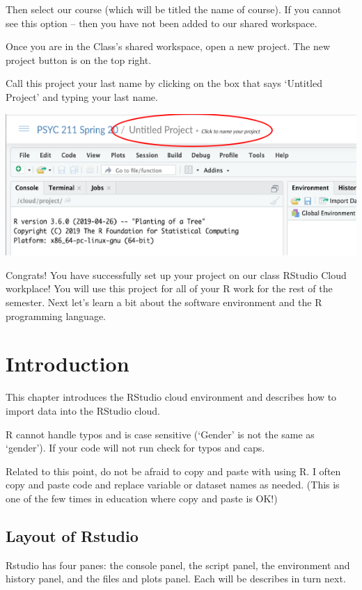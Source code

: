 \documentclass[
]{book}
\begin{document}
Then select our course (which will be titled the name of course). If you cannot see this option -- then you have not been added to our shared workspace.

Once you are in the Class's shared workspace, open a new project. The new project button is on the top right.

Call this project your last name by clicking on the box that says `Untitled Project' and typing your last name.

\includegraphics{img/Projname.png}

Congrats! You have successfully set up your project on our class RStudio Cloud workplace! You will use this project for all of your R work for the rest of the semester. Next let's learn a bit about the software environment and the R programming language.

\hypertarget{introduction}{%
\chapter{Introduction}\label{introduction}}

This chapter introduces the RStudio cloud environment and describes how to import data into the RStudio cloud.

R cannot handle typos and is case sensitive (`Gender' is not the same as `gender'). If your code will not run check for typos and caps.

Related to this point, do not be afraid to copy and paste with using R. I often copy and paste code and replace variable or dataset names as needed. (This is one of the few times in education where copy and paste is OK!)

\hypertarget{layout-of-rstudio}{%
\section{Layout of Rstudio}\label{layout-of-rstudio}}

Rstudio has four panes: the console panel, the script panel, the environment and history panel, and the files and plots panel. Each will be describes in turn next.
\end{document}
